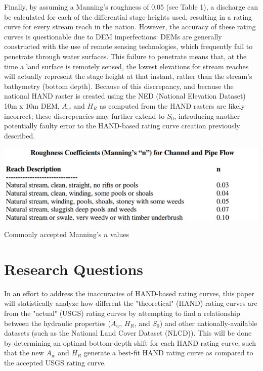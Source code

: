\documentclass[11pt]{article}
\begin{document}
Finally, by assuming a Manning's roughness of 0.05 (see Table 1), a discharge can be calculated for each of the differential stage-heights used, resulting in a rating curve for every stream reach in the nation. However, the accuracy of these rating curves is questionable due to DEM imperfections: DEMs are generally constructed with the use of remote sensing technologies, which frequently fail to penetrate through water surfaces. This failure to penetrate means that, at the time a land surface is remotely sensed, the lowest elevations for stream reaches will actually represent the stage height at that instant, rather than the stream's bathymetry (bottom depth). Because of this discrepancy, and because the national HAND raster is created using the NED (National Elevation Dataset) 10m x 10m DEM, $A_w$ and $H_R$ as computed from the HAND rasters are likely incorrect; these discrepencies may further extend to $S_0$, introducing another potentially faulty error to the HAND-based rating curve creation previously described. 

\begin{table}[h]
\centering
\includegraphics[keepaspectratio, width=.8\textwidth]{n_vals.png}
\caption{Commonly accepted Manning's $n$ values \cite{roughnesstable}}
\end{table}


\section*{Research Questions} %

In an effort to address the inaccuracies of HAND-based rating curves, this paper will statistically analyze how different the "theoretical" (HAND) rating curves are from the "actual" (USGS) rating curves by attempting to find a relationship between the hydraulic properties ($A_w$, $H_R$, and $S_0$) and other nationally-available datasets (such as the National Land Cover Dataset (NLCD)). This will be done by determining an optimal bottom-depth shift for each HAND rating curve, such that the new $A_w$ and $H_R$ generate a best-fit HAND rating curve as compared to the accepted USGS rating curve. 
\end{document}
